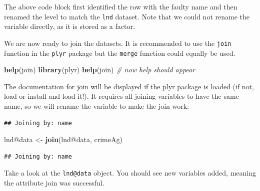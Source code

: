 \documentclass[]{article}
\newenvironment{Shaded}{}{}
\newcommand{\KeywordTok}[1]{\textcolor[rgb]{0.00,0.44,0.13}{\textbf{{#1}}}}
\newcommand{\DataTypeTok}[1]{\textcolor[rgb]{0.56,0.13,0.00}{{#1}}}
\newcommand{\DecValTok}[1]{\textcolor[rgb]{0.25,0.63,0.44}{{#1}}}
\newcommand{\StringTok}[1]{\textcolor[rgb]{0.25,0.44,0.63}{{#1}}}
\newcommand{\CommentTok}[1]{\textcolor[rgb]{0.38,0.63,0.69}{\textit{{#1}}}}
\newcommand{\NormalTok}[1]{{#1}}
\begin{document}
\begin{Shaded}
\end{Shaded}
The above code block first identified the row with the faulty name and
then renamed the level to match the \texttt{lnd} dataset. Note that we
could not rename the variable directly, as it is stored as a factor.

We are now ready to join the datasets. It is recommended to use the
\texttt{join} function in the \texttt{plyr} package but the
\texttt{merge} function could equally be used.

\begin{Shaded}
\begin{Highlighting}[]
\KeywordTok{help}\NormalTok{(join)}
\KeywordTok{library}\NormalTok{(plyr)}
\KeywordTok{help}\NormalTok{(join)  }\CommentTok{# now help should appear}
\end{Highlighting}
\end{Shaded}
The documentation for join will be displayed if the plyr package is
loaded (if not, load or install and load it!). It requires all joining
variables to have the same name, so we will rename the variable to make
the join work:

\begin{Shaded}
\end{Shaded}
\begin{verbatim}
## Joining by: name
\end{verbatim}
\begin{Shaded}
\begin{Highlighting}[]
\NormalTok{lnd@data <- }\KeywordTok{join}\NormalTok{(lnd@data, crimeAg)}
\end{Highlighting}
\end{Shaded}
\begin{verbatim}
## Joining by: name
\end{verbatim}
Take a look at the \texttt{lnd@data} object. You should see new
variables added, meaning the attribute join was successful.
\end{document}
